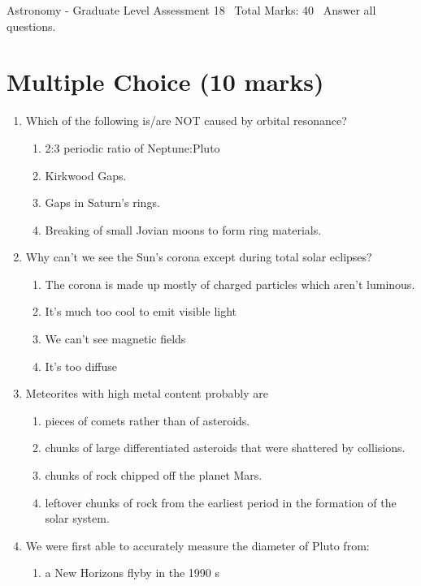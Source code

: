 \documentclass[12pt]{article}
\begin{document}
\begin{center}
Astronomy - Graduate Level Assessment 18 \
Total Marks: 40 \
Answer all questions.
\end{center}

\section*{Multiple Choice (10 marks)}
\begin{enumerate}[label=\arabic*.]
\item Which of the following is/are NOT caused by orbital resonance?
\begin{enumerate}[label=(\alph*)]
    \item 2:3 periodic ratio of Neptune:Pluto
    \item Kirkwood Gaps.
    \item Gaps in Saturn's rings.
    \item Breaking of small Jovian moons to form ring materials.
\end{enumerate}
\item Why can't we see the Sun's corona except during total solar eclipses?
\begin{enumerate}[label=(\alph*)]
    \item The corona is made up mostly of charged particles which aren't luminous.
    \item It's much too cool to emit visible light
    \item We can't see magnetic fields
    \item It's too diffuse
\end{enumerate}
\item Meteorites with high metal content probably are
\begin{enumerate}[label=(\alph*)]
    \item pieces of comets rather than of asteroids.
    \item chunks of large differentiated asteroids that were shattered by collisions.
    \item chunks of rock chipped off the planet Mars.
    \item leftover chunks of rock from the earliest period in the formation of the solar system.
\end{enumerate}
\item We were first able to accurately measure the diameter of Pluto from:
\begin{enumerate}[label=(\alph*)]
    \item a New Horizons flyby in the 1990 s

\end{enumerate}
\end{enumerate}
\end{document}
